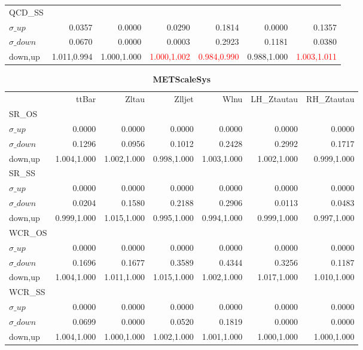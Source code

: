 \documentclass[11pt,oneside,a4paper]{article}
\begin{document}
\begin{table}
\begin{tabular}{lrrrrrr}
\hline
QCD\_SS &  &  &  &  &  &  \\
$\sigma\_up$ & 0.0357 & 0.0000 & 0.0290 & 0.1814 & 0.0000 & 0.1357 \\
$\sigma\_down$ & 0.0670 & 0.0000 & 0.0003 & 0.2923 & 0.1181 & 0.0380 \\
down,up & 1.011,0.994 & 1.000,1.000 & \textcolor{red}{1.000,1.002} & \textcolor{red}{0.984,0.990} & 0.988,1.000 & \textcolor{red}{1.003,1.011} \\

\hline
\end{tabular}
\end{table}
\begin{table}
\centering
\caption{\bf{METScaleSys}}
\begin{tabular}{lrrrrrr}
 & ttBar & Zltau & Zlljet & Wlnu & LH\_Ztautau & RH\_Ztautau \\
SR\_OS &  &  &  &  &  &  \\
$\sigma\_up$ & 0.0000 & 0.0000 & 0.0000 & 0.0000 & 0.0000 & 0.0000 \\
$\sigma\_down$ & 0.1296 & 0.0956 & 0.1012 & 0.2428 & 0.2992 & 0.1717 \\
down,up & 1.004,1.000 & 1.002,1.000 & 0.998,1.000 & 1.003,1.000 & 1.002,1.000 & 0.999,1.000 \\

\hline
SR\_SS &  &  &  &  &  &  \\
$\sigma\_up$ & 0.0000 & 0.0000 & 0.0000 & 0.0000 & 0.0000 & 0.0000 \\
$\sigma\_down$ & 0.0204 & 0.1580 & 0.2188 & 0.2906 & 0.0113 & 0.0483 \\
down,up & 0.999,1.000 & 1.015,1.000 & 0.995,1.000 & 0.994,1.000 & 0.999,1.000 & 0.997,1.000 \\

\hline
WCR\_OS &  &  &  &  &  &  \\
$\sigma\_up$ & 0.0000 & 0.0000 & 0.0000 & 0.0000 & 0.0000 & 0.0000 \\
$\sigma\_down$ & 0.1696 & 0.1677 & 0.3589 & 0.4344 & 0.3256 & 0.1187 \\
down,up & 1.004,1.000 & 1.011,1.000 & 1.015,1.000 & 1.002,1.000 & 1.017,1.000 & 1.010,1.000 \\

\hline
WCR\_SS &  &  &  &  &  &  \\
$\sigma\_up$ & 0.0000 & 0.0000 & 0.0000 & 0.0000 & 0.0000 & 0.0000 \\
$\sigma\_down$ & 0.0699 & 0.0000 & 0.0520 & 0.1819 & 0.0000 & 0.0000 \\
down,up & 1.004,1.000 & 1.000,1.000 & 1.002,1.000 & 1.001,1.000 & 1.000,1.000 & 1.000,1.000 \\


\end{tabular}
\end{table}
\end{document}
